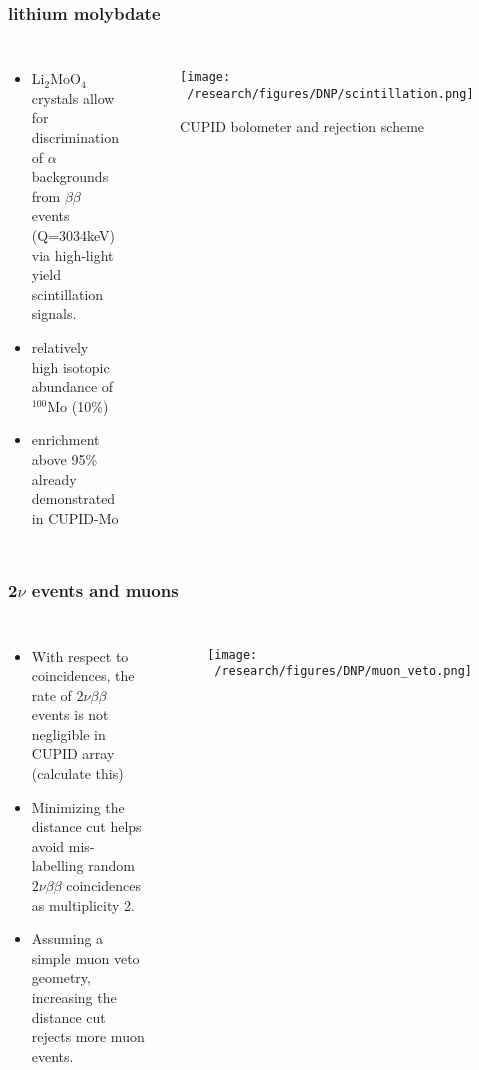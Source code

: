 \documentclass{beamer}
\begin{document}

	\begin{frame}
		\frametitle{lithium molybdate}
		\begin{columns}[c] %
			
			\begin{itemize}
				\item Li$_2$MoO$_4$ crystals allow for discrimination of $\alpha$ backgrounds from $\beta\beta$ events (Q=3034keV) via high-light yield scintillation signals.
				\item relatively high isotopic abundance of $^{100}$Mo (10\%)
				\item enrichment above 95\% already demonstrated in CUPID-Mo \cite{}
			\end{itemize}
			
			\begin{figure}
			\texttt{[image: ~/research/figures/DNP/scintillation.png]}
			\caption{CUPID bolometer and rejection scheme}
			\end{figure}
		\end{columns}
	\end{frame}

	

	\begin{frame}
		\frametitle{2$\nu$ events and muons}
		\begin{columns}[c] %
			
			\begin{itemize}
				\item With respect to coincidences, the rate of $2\nu\beta\beta$ events is not negligible in CUPID array (calculate this)
				\item Minimizing the distance cut helps avoid mis-labelling random $2\nu\beta\beta$ coincidences as multiplicity 2.
				\item Assuming a simple muon veto geometry, increasing the distance cut rejects more muon events.
			\end{itemize}
			
			\begin{figure}
			\texttt{[image: ~/research/figures/DNP/muon\_veto.png]}
			\end{figure}
			
		\end{columns}
	\end{frame}
\end{document}
